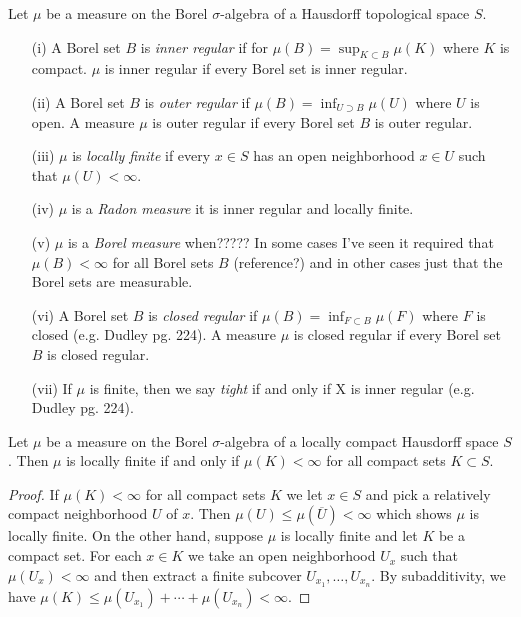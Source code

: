 \begin{defn}Let $\mu$ be a measure on the Borel $\sigma$-algebra of a
Hausdorff topological space $S$.  
\begin{itemize}
\item[(i)] A Borel set $B$ is \emph{inner regular} if for
 $\mu(B) = \sup_{K \subset B} \mu(K)$ where $K$
  is compact. $\mu$ is inner regular if every Borel set is inner regular.
\item[(ii)]A Borel set $B$ is \emph{outer regular} if $\mu(B) = \inf_{U \supset B} \mu(U)$ where $U$
  is open.  A measure $\mu$ is outer regular if every Borel set
  $B$ is outer regular.
\item[(iii)] $\mu$ is \emph{locally finite} if every $x \in S$ has an
  open neighborhood $x \in U$ such that $\mu(U) < \infty$.
\item[(iv)] $\mu$ is a \emph{Radon measure} it is inner regular and
  locally finite.
\item[(v)] $\mu$ is a \emph{Borel measure} when?????  In some cases
  I've seen it required that $\mu(B) < \infty$ for all Borel sets $B$
  (reference?) and in other cases just that the Borel sets are measurable.
\item[(vi)]A Borel set  $B$ is \emph{closed regular} if $\mu(B) = \inf_{F \subset B} \mu(F)$ where $F$
  is closed (e.g. Dudley pg. 224).  A measure $\mu$ is closed regular
  if every Borel set $B$ is closed regular.
\item[(vii)] If $\mu$ is finite, then we say \emph{tight} if and only if
  X is inner regular (e.g. Dudley pg. 224).
\end{itemize}
\end{defn}

\begin{prop}\label{LocallyFiniteMeasuresLCH}Let $\mu$ be a measure on the Borel $\sigma$-algebra of a
  locally compact Hausdorff space $S$.  Then $\mu$ is locally finite
  if and only if $\mu(K) < \infty$ for all compact sets $K \subset S$.
\end{prop}
\begin{proof}
If $\mu(K) < \infty$ for all compact sets $K$ we let $x \in S$ and
pick a relatively compact neighborhood $U$ of $x$.  Then $\mu(U) \leq
\mu(\overline{U}) < \infty$ which shows $\mu$ is locally finite.  On
the other hand, suppose $\mu$ is locally finite and let $K$ be a
compact set.  For each $x \in K$ we take an open neighborhood $U_x$
such that $\mu(U_x) < \infty$ and then extract a finite subcover $U_{x_1},
\dotsc,U_{x_n}$.  By subadditivity, we have $\mu(K) \leq \mu(U_{x_1}) + \dotsb
+ \mu(U_{x_n}) < \infty$.
\end{proof}

